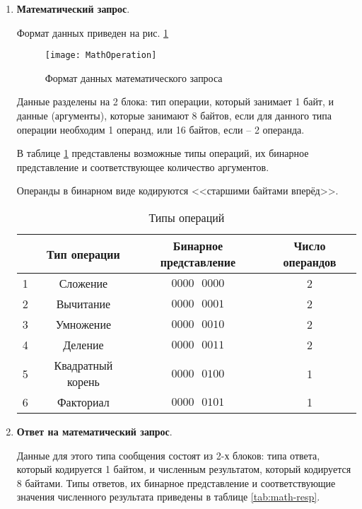 \begin{enumerate}
	\item \textbf{Математический запрос}.
	
	Формат данных приведен на рис. \ref{fig:math-req}
	
	\begin{figure}[H]
		\centering
		\texttt{[image: MathOperation]}
		\caption{Формат данных математического запроса}
		\label{fig:math-req}
	\end{figure}
	
	Данные разделены на 2 блока: тип операции, который занимает 1 байт, и данные (аргументы), которые занимают 8 байтов, если для данного типа операции необходим 1 операнд, или 16 байтов, если -- 2 операнда.
	
	В таблице \ref{tab:msg-types} представлены возможные типы операций, их бинарное представление и соответствующее количество аргументов.

	Операнды в бинарном виде кодируются <<старшими байтами вперёд>>.

	\begin{table}[H]
	\begin{center}
		\caption{Типы операций}
		\label{tab:msg-types}
		\def\tabcolsep{4pt}
		\begin{tabular}{|c|c|c|c|}
			\hline 
			& Тип операции & Бинарное представление & Число операндов \\ 
			\hline 
			1 & Сложение & $0000\text{ }0000$ & 2\\ 
			\hline 
			2 & Вычитание & $0000\text{ }0001$ & 2\\ 
			\hline 
			3 & Умножение & $0000\text{ }0010$ & 2\\ 
			\hline 
			4 & Деление & $0000\text{ }0011$ & 2\\ 
			\hline
			5 & Квадратный корень & $0000\text{ }0100$ & 1\\ 
			\hline 
			6 & Факториал & $0000\text{ }0101$  & 1\\ 
			\hline 
		\end{tabular} 
	\end{center}
	\end{table}
	
	\item \textbf{Ответ на математический запрос}.
	
	Данные для этого типа сообщения состоят из 2-х блоков: типа ответа, который кодируется 1 байтом, и численным результатом, который кодируется 8 байтами. Типы ответов, их бинарное представление и соответствующие значения численного результата приведены в таблице \ref{tab:math-resp}.
	

\end{enumerate}
